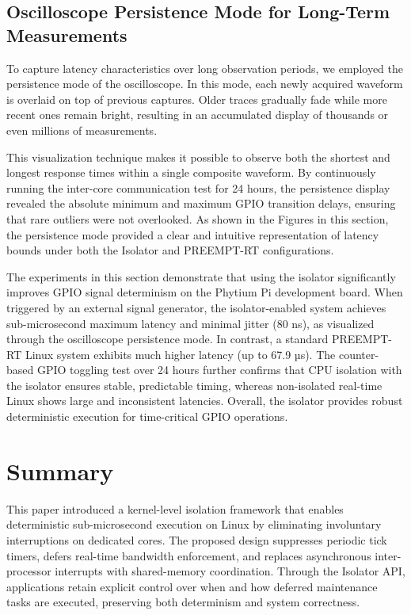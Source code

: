 \documentclass[letterpaper]{article}
\begin{document}
\subsection{Oscilloscope Persistence Mode for Long-Term Measurements}

To capture latency characteristics over long observation periods, we employed the persistence
mode of the oscilloscope. In this mode, each newly acquired waveform is overlaid on top of
previous captures. Older traces gradually fade while more recent ones remain bright, resulting
in an accumulated display of thousands or even millions of measurements.

This visualization technique makes it possible to observe both the shortest and longest response
times within a single composite waveform. By continuously running the inter-core communication
test for 24 hours, the persistence display revealed the absolute minimum and maximum GPIO
transition delays, ensuring that rare outliers were not overlooked. As shown in
the Figures in this section, the persistence mode provided
a clear and intuitive representation of latency bounds under both the Isolator and PREEMPT-RT
configurations.


The experiments in this section demonstrate that using the isolator significantly improves GPIO signal determinism on the Phytium Pi development board. When triggered by an external signal generator, the isolator-enabled system achieves sub-microsecond maximum latency and minimal jitter (80 ns), as visualized through the oscilloscope persistence mode. In contrast, a standard PREEMPT-RT Linux system exhibits much higher latency (up to 67.9 µs). The counter-based GPIO toggling test over 24 hours further confirms that CPU isolation with the isolator ensures stable, predictable timing, whereas non-isolated real-time Linux shows large and inconsistent latencies. Overall, the isolator provides robust deterministic execution for time-critical GPIO operations.

\section{Summary}
This paper introduced a kernel-level isolation framework that enables deterministic sub-microsecond execution on Linux by eliminating involuntary interruptions on dedicated cores. The proposed design suppresses periodic tick timers, defers real-time bandwidth enforcement, and replaces asynchronous inter-processor interrupts with shared-memory coordination. Through the Isolator API, applications retain explicit control over when and how deferred maintenance tasks are executed, preserving both determinism and system correctness.
\end{document}
